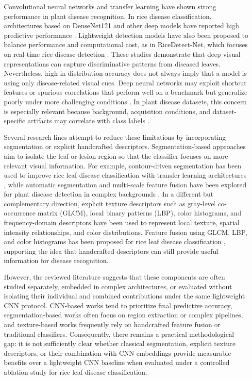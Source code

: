 Convolutional neural networks and transfer learning have shown strong performance in plant disease recognition. In rice disease classification, architectures based on DenseNet121 and other deep models have reported high predictive performance \cite{ismail2026densenet}. Lightweight detection models have also been proposed to balance performance and computational cost, as in RiceDetect-Net, which focuses on real-time rice disease detection \cite{yuan2026ricedetectnet}. These studies demonstrate that deep visual representations can capture discriminative patterns from diseased leaves. Nevertheless, high in-distribution accuracy does not always imply that a model is using only disease-related visual cues. Deep neural networks may exploit shortcut features or spurious correlations that perform well on a benchmark but generalize poorly under more challenging conditions \cite{geirhos2020shortcut}. In plant disease datasets, this concern is especially relevant because background, acquisition conditions, and dataset-specific artifacts may correlate with class labels \cite{noyan2022plantvillage_bias}.

Several research lines attempt to reduce these limitations by incorporating segmentation or explicit handcrafted descriptors. Segmentation-based approaches aim to isolate the leaf or lesion region so that the classifier focuses on more relevant visual information. For example, contour-driven segmentation has been used to improve rice leaf disease classification with transfer learning architectures \cite{shakeel2026contour}, while automatic segmentation and multi-scale feature fusion have been explored for plant disease detection in complex backgrounds \cite{arora2025complex}. In a different but complementary direction, explicit texture descriptors such as gray-level co-occurrence matrix (GLCM), local binary patterns (LBP), color histograms, and frequency-domain descriptors have been used to represent local texture, spatial intensity relationships, and color distributions. Feature fusion using GLCM, LBP, and color histograms has been proposed for rice leaf disease classification \cite{sutikno2026glcm_lbp_color}, supporting the idea that handcrafted descriptors can still provide useful information for disease recognition.

However, the reviewed literature suggests that these components are often studied separately, embedded in complex architectures, or evaluated without isolating their individual and combined contributions under the same lightweight CNN protocol. CNN-based works tend to prioritize final predictive accuracy, segmentation-based works often focus on region extraction or complex pipelines, and texture-based works frequently rely on handcrafted feature fusion or traditional classifiers. Consequently, there remains a practical methodological gap: it is not sufficiently clear whether classical segmentation, explicit texture descriptors, or their combination with CNN embeddings provide measurable benefits over a lightweight CNN baseline when evaluated under a controlled ablation study for rice leaf disease classification.

